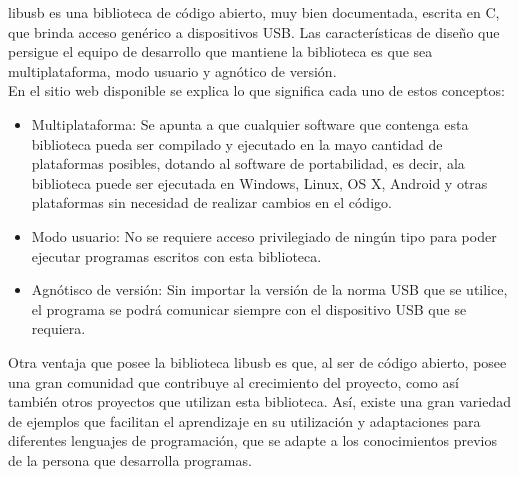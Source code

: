 	libusb es una biblioteca de código abierto, muy bien documentada, escrita en C, que brinda acceso genérico a dispositivos USB. Las características de diseño que persigue el equipo de desarrollo que mantiene la biblioteca es que sea multiplataforma, modo usuario y agnótico de versión.\\
	
	En el sitio web disponible %
	se explica lo que significa cada uno de estos conceptos:
	
	\begin{itemize}
		\item{Multiplataforma:} Se apunta a que cualquier software que contenga esta biblioteca pueda ser compilado y ejecutado en la mayo cantidad de plataformas posibles, dotando al software de portabilidad, es decir, ala biblioteca puede ser ejecutada en Windows, Linux, OS X, Android y otras plataformas sin necesidad de realizar cambios en el código.
		\item{Modo usuario:} No se requiere acceso privilegiado de ningún tipo para poder ejecutar programas escritos con esta biblioteca.
		\item{Agnótisco de versión:} Sin importar la versión de la norma USB que se utilice, el programa se podrá comunicar siempre con el dispositivo USB que se requiera.
	\end{itemize}
	
	Otra ventaja que posee la biblioteca libusb es que, al ser de código abierto, posee una gran comunidad que contribuye al crecimiento del proyecto, como así también otros proyectos que utilizan esta biblioteca. Así, existe una gran variedad de ejemplos que facilitan el aprendizaje en su utilización y adaptaciones para diferentes lenguajes de programación, que se adapte a los conocimientos previos de la persona que desarrolla programas.